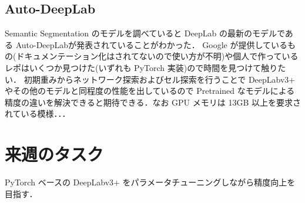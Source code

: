 \documentclass[onecolumn]{ujarticle}   %
\begin{document}
	\subsection{Auto-DeepLab}
	Semantic Segmentation のモデルを調べていると DeepLab の最新のモデルである Auto-DeepLab\cite{DBLP:journals/corr/abs-1901-02985}が発表されていることがわかった．
	Google が提供しているもの(ドキュメンテーション化はされてないので使い方が不明)や個人で作っているレポはいくつか見つけた(いずれも PyTorch 実装)ので時間を見つけて触りたい．
	初期重みからネットワーク探索およびセル探索を行うことで DeepLabv3+ やその他のモデルと同程度の性能を出しているので Pretrained なモデルによる精度の違いを解決できると期待できる．なお GPU メモリは 13GB 以上を要求されている模様．．．

	\section{来週のタスク}
	PyTorch ベースの DeepLabv3+ をパラメータチューニングしながら精度向上を目指す．

	
	
\end{document}
